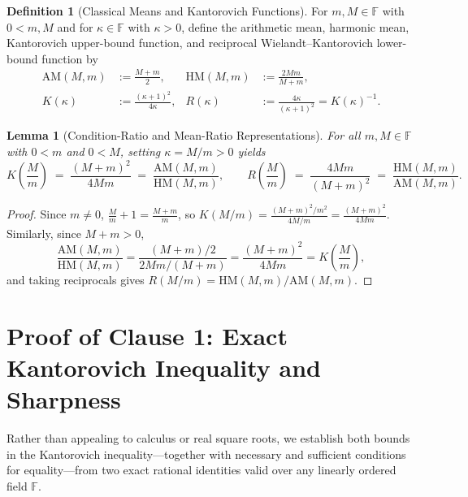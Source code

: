 \documentclass[11pt,a4paper]{article}
\newtheorem{lemma}[theorem]{Lemma}
\theoremstyle{definition}
\newtheorem{definition}[theorem]{Definition}
\newcommand{\AM}{\mathrm{AM}}
\newcommand{\HM}{\mathrm{HM}}
\begin{document}
\begin{definition}[Classical Means and Kantorovich Functions]
For $m, M \in \mathbb{F}$ with $0 < m, M$ and for $\kappa \in \mathbb{F}$ with
$\kappa > 0$, define the arithmetic mean, harmonic mean, Kantorovich upper-bound
function, and reciprocal Wielandt--Kantorovich lower-bound function by
\begin{align*}
  \AM(M,m) &:= \frac{M + m}{2}, &
  \HM(M,m) &:= \frac{2Mm}{M + m}, \\
  K(\kappa) &:= \frac{(\kappa + 1)^2}{4\kappa}, &
  R(\kappa) &:= \frac{4\kappa}{(\kappa + 1)^2} = K(\kappa)^{-1}.
\end{align*}
\end{definition}

\begin{lemma}[Condition-Ratio and Mean-Ratio Representations]
\label{lem:means}
For all $m, M \in \mathbb{F}$ with $0 < m$ and $0 < M$, setting $\kappa = M/m > 0$
yields
\begin{equation}
  \label{eq:K-identities}
  K\!\left(\frac{M}{m}\right)
  \;=\; \frac{(M + m)^2}{4Mm}
  \;=\; \frac{\AM(M,m)}{\HM(M,m)}, \qquad
  R\!\left(\frac{M}{m}\right)
  \;=\; \frac{4Mm}{(M + m)^2}
  \;=\; \frac{\HM(M,m)}{\AM(M,m)}.
\end{equation}
\end{lemma}
\begin{proof}
Since $m \ne 0$, $\frac{M}{m} + 1 = \frac{M+m}{m}$, so
$K(M/m) = \frac{(M+m)^2/m^2}{4M/m} = \frac{(M+m)^2}{4Mm}$. Similarly, since
$M + m > 0$,
\[
  \frac{\AM(M,m)}{\HM(M,m)}
  = \frac{(M+m)/2}{2Mm/(M+m)}
  = \frac{(M+m)^2}{4Mm}
  = K\!\left(\frac{M}{m}\right),
\]
and taking reciprocals gives $R(M/m) = \HM(M,m)/\AM(M,m)$.
\end{proof}

\section{Proof of Clause 1: Exact Kantorovich Inequality and Sharpness}
\label{sec:clause1}

Rather than appealing to calculus or real square roots, we establish both bounds
in the Kantorovich inequality---together with necessary and sufficient conditions
for equality---from two exact rational identities valid over any linearly ordered
field $\mathbb{F}$.
\end{document}

